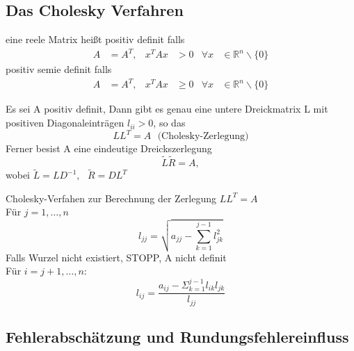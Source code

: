 \documentclass[
	ngerman,
	accentcolor=9c,%
	type=intern,
	marginpar=false
	]{tudapub}
\begin{document}
    \subsection{Das Cholesky Verfahren}
    \begin{definition}
        eine reele Matrix heißt positiv definit falls
        \begin{align*}
            A&=A^T, & x^TAx &>0 & \forall x &\in \mathbb{R}^n \backslash \{0\}
        \end{align*}
        positiv semie definit falls
        \begin{align*}
            A&=A^T, & x^TAx &\geq 0 & \forall x &\in \mathbb{R}^n \backslash \{0\}
        \end{align*}
    \end{definition}
    \begin{satz}
        Es sei A positiv definit, Dann gibt es genau eine untere Dreickmatrix L mit positiven Diagonaleinträgen $l_{ii} > 0$, so das
        \begin{equation*}
            LL^T = A \mbox{ } \text{(Cholesky-Zerlegung)}
        \end{equation*}
        Ferner besist A eine eindeutige Dreickszerlegung
        \begin{equation*}
            \tilde{L}\tilde{R}= A,
        \end{equation*}
        wobei $\tilde{L} = LD^{-1}, \mbox{ } \tilde{R} = DL^T$
    \end{satz}
    \begin{satz}
        Cholesky-Verfahen zur Berechnung der Zerlegung $LL^T = A$\\
        Für $j= 1,\dots ,n$
        \begin{equation*}
            l_{jj} =\sqrt{a_{jj}-\sum^{j-1}_{k=1}l_{jk}^2}
        \end{equation*}
        Falls Wurzel nicht existiert, STOPP, A nicht definit\\
        \hspace{20mm} Für $i=j+1,\dots,n:$
        \begin{equation*}
            l_{ij} = \dfrac{a_{ij}-\Sigma_{k=1}^{j-1}l_{ik}l_{jk}}{l_{jj}}
        \end{equation*}
    \end{satz}
    \subsection{Fehlerabschätzung und Rundungsfehlereinfluss}
\end{document}
